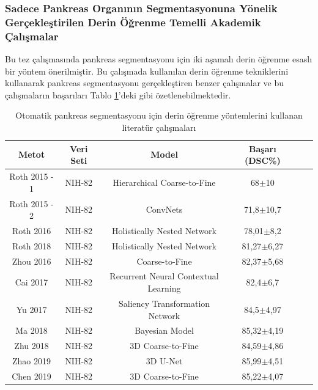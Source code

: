 \subsubsection{Sadece Pankreas Organının Segmentasyonuna Yönelik Gerçekleştirilen Derin Öğrenme Temelli Akademik Çalışmalar}
Bu tez çalışmasında pankreas segmentasyonu için iki aşamalı derin öğrenme esaslı bir yöntem önerilmiştir. Bu çalışmada kullanılan derin öğrenme tekniklerini kullanarak pankreas segmentasyonu gerçekleştiren benzer çalışmalar ve bu çalışmaların başarıları Tablo \ref{tab:lit1}'deki gibi özetlenebilmektedir.

\begin{table}[h!]
	\centering
	\caption{Otomatik pankreas segmentasyonu için derin öğrenme yöntemlerini kullanan literatür çalışmaları}
	\label{tab:lit1}
	\begin{tabular}{cccccc}
		\toprule
		Metot                           &  Veri Seti   &  Model              & Başarı (DSC\%)  \\ 
		\midrule 
		Roth 2015 - 1 \cite{roth2015deep}  &  NIH-82    &  Hierarchical Coarse-to-Fine          & 68$\pm$10   \\ 
		Roth 2015 - 2 \cite{roth2015deeporgan}  &  NIH-82    &  ConvNets                             & 71,8$\pm$10,7 \\
		Roth 2016     \cite{roth2016spatial}    &  NIH-82    &  Holistically Nested Network          & 78,01$\pm$8,2 \\
		Roth 2018     \cite{roth2018spatial}    &  NIH-82    &  Holistically Nested Network          & 81,27$\pm$6,27\\
		Zhou 2016     \cite{zhou2016pancreas}    &  NIH-82    &  Coarse-to-Fine                       & 82,37$\pm$5,68\\
		Cai 2017      \cite{cai2017improving}     &  NIH-82    &  Recurrent Neural Contextual Learning & 82,4$\pm$6,7 \\
		Yu  2017      \cite{yu2018recurrent}      &  NIH-82    &  Saliency Transformation Network      & 84,5$\pm$4,97 \\
		Ma 2018       \cite{ma2018novel}      &  NIH-82    &  Bayesian Model                      & 85,32$\pm$4,19 \\
		Zhu 2018      \cite{zhu20183d}     &  NIH-82    &  3D Coarse-to-Fine                   & 84,59$\pm$4,86 \\
		Zhao 2019     \cite{zhao2019fully}    &  NIH-82    &  3D U-Net                             & 85,99$\pm$4,51 \\
		Chen 2019     \cite{chen2019harnessing}    &  NIH-82    &  3D Coarse-to-Fine                   & 85,22$\pm$4,07 \\

\end{tabular}
\end{table}
